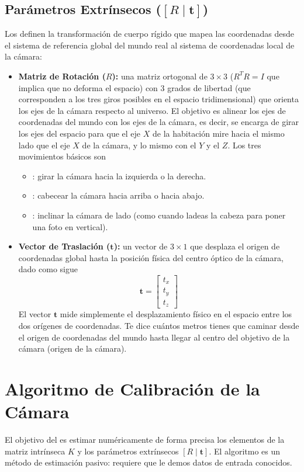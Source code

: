 \subsection{Parámetros Extrínsecos ($[R \mid \mathbf{t}]$)}
\noindent
Los  definen la transformación de cuerpo rígido que mapea las coordenadas desde el sistema de referencia global del mundo real al sistema de coordenadas local de la cámara:
\begin{itemize}
    \item \textbf{Matriz de Rotación ($R$):} una matriz ortogonal de $3 \times 3$ ($R^T R = I$ que implica que no deforma el espacio) con 3 grados de libertad (que corresponden a los tres giros posibles en el espacio tridimensional) que orienta los ejes de la cámara respecto al universo. El objetivo es alinear los ejes de coordenadas del mundo con los ejes de la cámara, es decir, se encarga de girar los ejes del espacio para que el eje $X$ de la habitación mire hacia el mismo lado que el eje $X$ de la cámara, y lo mismo con el $Y$ y el $Z$. Los tres movimientos básicos son
    \begin{itemize}
        \item {}: girar la cámara hacia la izquierda o la derecha.
        \item {}: cabecear la cámara hacia arriba o hacia abajo.
        \item {}: inclinar la cámara de lado (como cuando ladeas la cabeza para poner una foto en vertical).
    \end{itemize}
    
    \item \textbf{Vector de Traslación ($\mathbf{t}$):} un vector de $3 \times 1$ que desplaza el origen de coordenadas global hasta la posición física del centro óptico de la cámara, dado como sigue
    $$\mathbf{t} = \begin{bmatrix} t_x \\ t_y \\ t_z \end{bmatrix}$$
    El vector $\mathbf{t}$ mide simplemente el desplazamiento físico en el espacio entre los dos orígenes de coordenadas. Te dice cuántos metros tienes que caminar desde el origen de coordenadas del mundo hasta llegar al centro del objetivo de la cámara (origen de la cámara).
\end{itemize}

\section{Algoritmo de Calibración de la Cámara}
El objetivo del  es estimar numéricamente de forma precisa los elementos de la matriz intrínseca $K$ y los parámetros extrínsecos $[R \mid \mathbf{t}]$. El algoritmo es un método de estimación pasivo: requiere que le demos datos de entrada conocidos.

